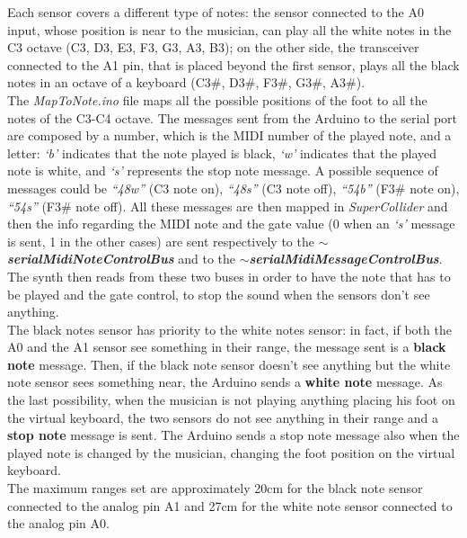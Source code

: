 \documentclass{article}
\begin{document}
Each sensor covers a different type of notes: the sensor connected to the A0 input, whose position is near to the musician, can play all the white notes in the C3 octave (C3, D3, E3, F3, G3, A3, B3); on the other side, the transceiver connected to the A1 pin, that is placed beyond the first sensor, plays all the black notes in an octave of a keyboard (C3\#, D3\#, F3\#, G3\#, A3\#). 
\\The \textit{MapToNote.ino} file maps all the possible positions of the foot to all the notes of the C3-C4 octave. The messages sent from the Arduino to the serial port are composed by a number, which is the MIDI number of the played note, and a letter: \textit{‘b’} indicates that the note played is black, \textit{‘w’} indicates that the played note is white, and \textit{‘s’} represents the stop note message. A possible sequence of messages could be \textit{“48w”} (C3 note on), \textit{“48s”} (C3 note off), \textit{“54b”} (F3\# note on),  \textit{“54s”} (F3\# note off). All these messages are then mapped in \textit{SuperCollider} and then the info regarding the MIDI note and the gate value (0 when an \textit{‘s’} message is sent, 1 in the other cases) are sent respectively to the \textbf{\textit{$\sim$serialMidiNoteControlBus}} and to the \textbf{\textit{$\sim$serialMidiMessageControlBus}}. The synth then reads from these two buses in order to have the note that has to be played and the gate control, to stop the sound when the sensors don’t see anything. 
\\The black notes sensor has priority to the white notes sensor: in fact, if both the A0 and the A1 sensor see something in their range, the message sent is a \textbf{black note} message. Then, if the black note sensor doesn’t see anything but the white note sensor sees something near, the Arduino sends a \textbf{white note} message. As the last possibility, when the musician is not playing anything placing his foot on the virtual keyboard, the two sensors do not see anything in their range and a \textbf{stop note} message is sent. The Arduino sends a stop note message also when the played note is changed by the musician, changing the foot position on the virtual keyboard. 
\\The maximum ranges set are approximately 20cm for the black note sensor connected to the analog pin A1 and 27cm for the white note sensor connected to the analog pin A0.
\end{document}
